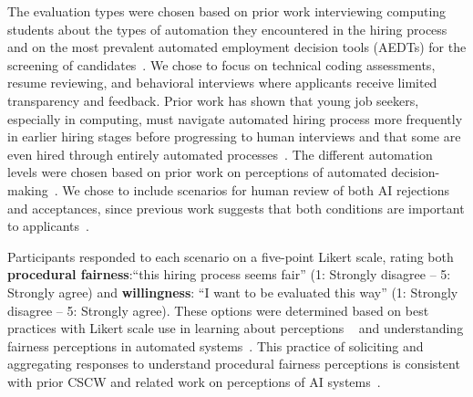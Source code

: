 
The evaluation types were chosen based on prior work interviewing computing students about the types of automation they encountered in the hiring process~\cite{armstrong2023navigating} and on the most prevalent automated employment decision tools (AEDTs) for the screening of candidates~\cite{sanchez2020does, bogen2018help}. We chose to focus on technical coding assessments, resume reviewing, and behavioral interviews where applicants receive limited transparency and feedback. Prior work has shown that young job seekers, especially in computing, must navigate automated hiring process more frequently in earlier hiring stages before progressing to human interviews and that some are even hired through entirely automated processes~\cite{armstrong2023navigating, sanchez2020does, bogen2018help}. The different automation levels were chosen based on prior work on perceptions of automated decision-making~\cite{zhang2022examining, lee2018understanding,binns2018s}. We chose to include scenarios for human review of both AI rejections and acceptances, since previous work suggests that both conditions are important to applicants~\cite{friedrich1993primary, roulin2014interviewers, morse2021ends, de2021use}. 

Participants responded to each scenario on a five-point Likert scale, rating both \textbf{procedural fairness}:``this hiring process seems fair'' (1: Strongly disagree -- 5: Strongly agree) and \textbf{willingness}: ``I want to be evaluated this way'' (1: Strongly disagree -- 5: Strongly agree). These options were determined based on best practices with Likert scale use in learning about perceptions ~\cite{jebb2021review, joshi2015likert} and understanding fairness perceptions in automated systems~\cite{lee2019procedural, schoeffer2021appropriate, morse2021ends}. This practice of soliciting and aggregating responses to understand procedural fairness perceptions is consistent with prior CSCW and related work on perceptions of AI systems~\cite{lee2019procedural, lee2018understanding, zhang2022examining, gonzalez2022allying}.

